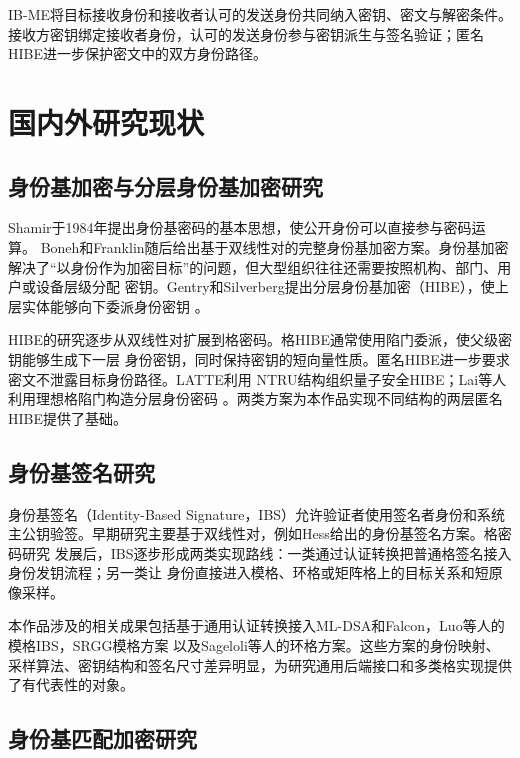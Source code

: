 IB-ME将目标接收身份和接收者认可的发送身份共同纳入密钥、密文与解密条件。接收方密钥绑定接收者身份，认可的发送身份参与密钥派生与签名验证；匿名HIBE进一步保护密文中的双方身份路径。

\section{国内外研究现状}

\subsection{身份基加密与分层身份基加密研究}

Shamir于1984年提出身份基密码的基本思想，使公开身份可以直接参与密码运算\cite{shamir1984}。
Boneh和Franklin随后给出基于双线性对的完整身份基加密方案\cite{bonehfranklin2003}。身份基加密
解决了“以身份作为加密目标”的问题，但大型组织往往还需要按照机构、部门、用户或设备层级分配
密钥。Gentry和Silverberg提出分层身份基加密（HIBE），使上层实体能够向下委派身份密钥
\cite{gentrysilverberg2002}。

HIBE的研究逐步从双线性对扩展到格密码。格HIBE通常使用陷门委派，使父级密钥能够生成下一层
身份密钥，同时保持密钥的短向量性质。匿名HIBE进一步要求密文不泄露目标身份路径。LATTE利用
NTRU结构组织量子安全HIBE\cite{zhao2024latte}；Lai等人利用理想格陷门构造分层身份密码
\cite{lai2015trapdoors}。两类方案为本作品实现不同结构的两层匿名HIBE提供了基础。

\subsection{身份基签名研究}

身份基签名（Identity-Based Signature，IBS）允许验证者使用签名者身份和系统主公钥验签。早期研究主要基于双线性对，例如Hess给出的身份基签名方案\cite{hess2003ibs}。格密码研究
发展后，IBS逐步形成两类实现路线：一类通过认证转换把普通格签名接入身份发钥流程；另一类让
身份直接进入模格、环格或矩阵格上的目标关系和短原像采样。

本作品涉及的相关成果包括基于通用认证转换接入ML-DSA和Falcon\cite{galindo2006ibs,
nist2024fips204,falcon2020}，Luo等人的模格IBS\cite{luo2024ibs}，SRGG模格方案
\cite{jia2025ibs}以及Sageloli等人的环格方案\cite{sageloli2023ibs}。这些方案的身份映射、
采样算法、密钥结构和签名尺寸差异明显，为研究通用后端接口和多类格实现提供了有代表性的对象。

\subsection{身份基匹配加密研究}

